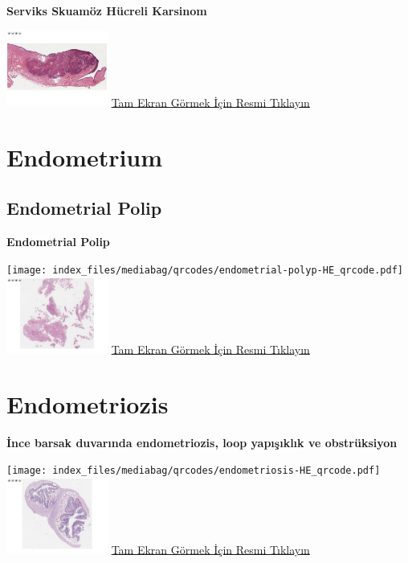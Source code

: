 \documentclass[
  letterpaper,
  DIV=11,
  numbers=noendperiod]{scrreprt}
\begin{document}
\textbf{Serviks Skuamöz Hücreli Karsinom}

\href{https://images.patolojiatlasi.com/cervix-SCC/HE.html}{\includegraphics[width=0.25\textwidth,height=\textheight]{./screenshots/thumbnail_cervix-SCC.png}}
\href{https://images.patolojiatlasi.com/cervix-SCC/HE.html}{Tam Ekran
Görmek İçin Resmi Tıklayın}

\hypertarget{sec-endometrium}{%
\chapter{Endometrium}\label{sec-endometrium}}

\hypertarget{sec-endometrial-polip}{%
\section{Endometrial Polip}\label{sec-endometrial-polip}}

\textbf{Endometrial Polip}

\texttt{[image: index\_files/mediabag/qrcodes/endometrial-polyp-HE\_qrcode.pdf]}
\href{https://images.patolojiatlasi.com/endometrial-polyp/HE.html}{\includegraphics[width=0.25\textwidth,height=\textheight]{./screenshots/thumbnail_endometrial-polyp.png}}
\href{https://images.patolojiatlasi.com/endometrial-polyp/HE.html}{Tam
Ekran Görmek İçin Resmi Tıklayın}

\hypertarget{sec-endometriozis}{%
\chapter{Endometriozis}\label{sec-endometriozis}}

\textbf{İnce barsak duvarında endometriozis, loop yapışıklık ve
obstrüksiyon}

\texttt{[image: index\_files/mediabag/qrcodes/endometriosis-HE\_qrcode.pdf]}
\href{https://images.patolojiatlasi.com/endometriosis/HE.html}{\includegraphics[width=0.25\textwidth,height=\textheight]{./screenshots/thumbnail_endometriosis.png}}
\href{https://images.patolojiatlasi.com/endometriosis/HE.html}{Tam Ekran
Görmek İçin Resmi Tıklayın}
\end{document}

